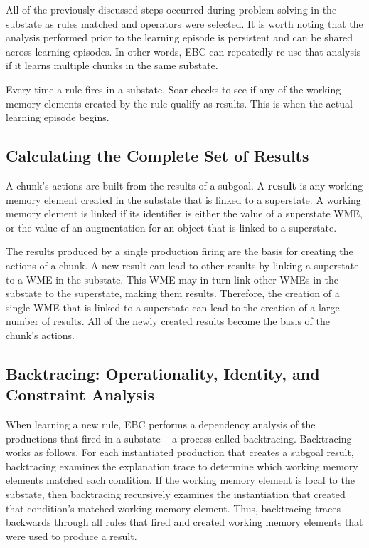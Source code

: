 All of the previously discussed steps occurred during problem-solving in the substate as rules matched and operators were selected.  It is worth noting that the analysis performed prior to the learning episode is persistent and can be shared across learning episodes.  In other words, EBC can repeatedly re-use that analysis if it learns multiple chunks in the same substate.  

Every time a rule fires in a substate, Soar checks to see if any of the working memory elements created by the rule qualify as results.  This is when the actual learning episode begins.

\subsection{Calculating the Complete Set of Results}
\label{CHUNKING-during-results}

A chunk's actions are built from the results of a subgoal. A \textbf{result} is any working memory element created in the substate that is linked to a superstate. A working memory element is linked if its identifier is either the value of a superstate WME, or the value of an augmentation for an object that is linked to a superstate.

The results produced by a single production firing are the basis for creating the actions of a chunk. A new result can lead to other results by linking a superstate to a WME in the substate. This WME may in turn link other WMEs in the substate to the superstate, making them results. Therefore, the creation of a single WME that is linked to a superstate can lead to the creation of a large number of results. All of the newly created results become the basis of the chunk's actions.

\subsection{Backtracing: Operationality, Identity, and Constraint Analysis}
\label{CHUNKING-during-backtracing}

When learning a new rule, EBC performs a dependency analysis of the productions that fired in a substate -- a process called backtracing. Backtracing works as follows.  For each instantiated production that creates a subgoal result, backtracing examines the explanation trace to determine which working memory elements matched each condition. If the working memory element is local to the substate, then backtracing recursively examines the instantiation that created that condition's matched working memory element. Thus, backtracing traces backwards through all rules that fired and created working memory elements that were used to produce a result.


